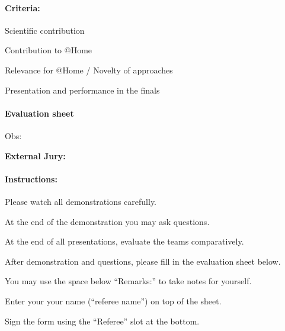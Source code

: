 \paragraph{Criteria:}
\begin{compactitem}
\item Scientific contribution
\item Contribution to @Home
\item Relevance for @Home / Novelty of approaches
\item Presentation and performance in the finals
\end{compactitem}



\paragraph{Evaluation sheet}
\begin{center}

\end{center}

Obs:


\clearpage
\begin{center}
\textbf{External Jury:}
\end{center} 

\paragraph{Instructions:}
\begin{compactenum}
\item Please watch all demonstrations carefully.
\item At the end of the demonstration you may ask questions.
\item At the end of all presentations, evaluate the teams comparatively.
\item After demonstration and questions, please fill in the evaluation sheet below.
\item You may use the space below \enquote{Remarks:} to take notes for yourself.
\item Enter your your name (\enquote{referee name}) on top of the sheet.
\item Sign the form using the \enquote{Referee} slot at the bottom.
\end{compactenum}



